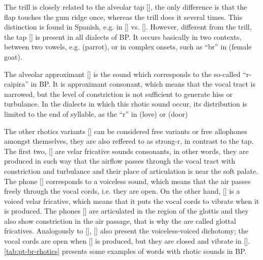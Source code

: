 The trill is closely related to the alveolar tap [], the only difference is that the flap touches the gum ridge once, whereas the trill does it several times. This distinction is found in Spanish, e.g. in  [] vs.  []. However, different from the trill, the tap [] is present in all dialects of \ac{BP}. It occurs basically in two contexts, between two vowels, e.g.  (parrot), or in complex onsets, such as ``br'' in  (female goat).

The alveolar approximant [] is the sound which corresponds to the so-called ``r-caipira'' in \ac{BP}. It is approximant consonant, which means that the vocal tract is narrowed, but the level of constriction is not sufficient to generate hiss or turbulance. In the dialects in which this rhotic sound occur, its distribution is limited to the end of syllable, as the ``r'' in  (love) or  (door)

The other rhotics variants [] can be considered free variants or free allophones amongst themselves, they are also reffered to as strong-r, in contrast to the tap. The first two, [] are velar fricative sounds consonants, in other words, they are produced in such way that the airflow passes through the vocal tract with constriction and turbulance and their place of articulation is near the soft palate. The phone [] corresponds to a voiceless sound, which means that the air passes freely through the vocal cords, i.e. they are open. On the other hand, [] is a voiced velar fricative, which means that it puts the vocal cords to vibrate when it is produced. The phones [] are articulated in the region of the glottis and they also show constriction in the air passage, that is why the are called glottal fricatives. Analogously to [], [] also present the voiceless-voiced dichotomy; the vocal cords are open when [] is produced, but they are closed and vibrate in []. \autoref{tab:pt-br-rhotics} presents some examples of words with rhotic sounds in \ac{BP}.

